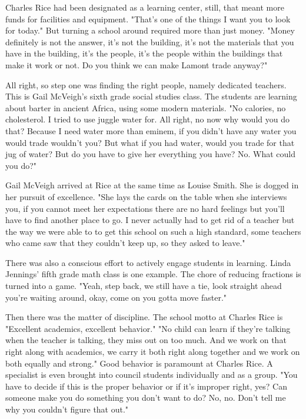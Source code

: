 Charles Rice had been designated as a learning center, still, that meant more funds for facilities and equipment. "That's one of the things I want you to look for today." But turning a school around required more than just money. "Money definitely is not the answer, it's not the building, it's not the materials that you have in the building, it's the people, it's the people within the buildings that make it work or not. Do you think we can make Lamont trade anyway?"

All right, so step one was finding the right people, namely dedicated teachers. This is Gail McVeigh's sixth grade social studies class. The students are learning about barter in ancient Africa, using some modern materials. "No calories, no cholesterol. I tried to use juggle water for. All right, no now why would you do that? Because I need water more than eminem, if you didn't have any water you would trade wouldn't you? But what if you had water, would you trade for that jug of water? But do you have to give her everything you have? No. What could you do?"

Gail McVeigh arrived at Rice at the same time as Louise Smith. She is dogged in her pursuit of excellence. "She lays the cards on the table when she interviews you, if you cannot meet her expectations there are no hard feelings but you'll have to find another place to go. I never actually had to get rid of a teacher but the way we were able to to get this school on such a high standard, some teachers who came saw that they couldn't keep up, so they asked to leave."

There was also a conscious effort to actively engage students in learning. Linda Jennings' fifth grade math class is one example. The chore of reducing fractions is turned into a game. "Yeah, step back, we still have a tie, look straight ahead you're waiting around, okay, come on you gotta move faster."

Then there was the matter of discipline. The school motto at Charles Rice is "Excellent academics, excellent behavior." "No child can learn if they're talking when the teacher is talking, they miss out on too much. And we work on that right along with academics, we carry it both right along together and we work on both equally and strong." Good behavior is paramount at Charles Rice. A specialist is even brought into council students individually and as a group. "You have to decide if this is the proper behavior or if it's improper right, yes? Can someone make you do something you don't want to do? No, no. Don't tell me why you couldn't figure that out."

